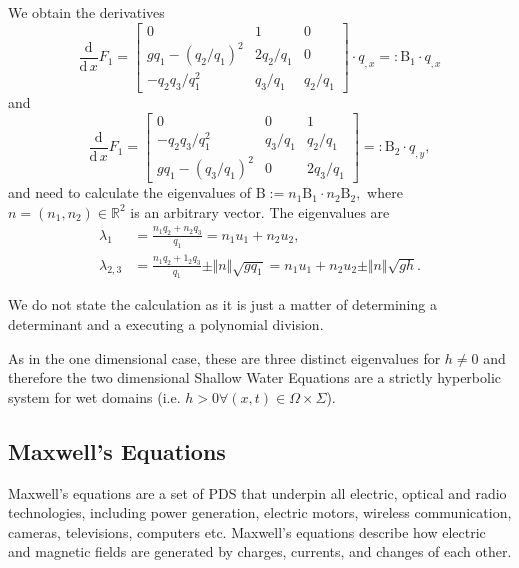 \documentclass[a4paper,12pt]{article}
\theoremstyle{definition}
\theoremstyle{definition}
\def\dx{\mathrm{d}\,x}
\begin{document}
We obtain the derivatives 
\begin{equation}
\frac{\mathrm{d}}{\dx}F_1 = 
\begin{bmatrix}
0 & 1 & 0 \\
gq_1-(q_2/q_1)^2 & 2q_2/q_1 & 0 \\
-q_2q_3/q_1^2 & q_3/q_1 & q_2/q_1
\end{bmatrix} \cdot q_{,x} =: \mathrm{B_1}\cdot q_{,x}
\end{equation}  
and
\begin{equation}
\frac{\mathrm{d}}{\dx}F_1 = 
\begin{bmatrix}
0 & 0 & 1 \\
-q_2q_3/q_1^2 & q_3/q_1 & q_2/q_1\\
gq_1-(q_3/q_1)^2 & 0 & 2q_3/q_1 
\end{bmatrix} =: \mathrm{B_2} \cdot q_{,y},
\end{equation}   
and need to calculate the eigenvalues of
$\mathrm{B}:= n_1\mathrm{B_1} \cdot n_2\mathrm{B_2}, $
where $n = (n_1, n_2) \in \mathbb{R}^2$ is an arbitrary vector.
The eigenvalues are 
\begin{align}
\lambda_1 &= \frac{n_1q_2+n_2q_3}{q_1} = n_1u_1 + n_2u_2, \\
\lambda_{2,3} &= \frac{n_1q_2+1_2q_3}{q_1} \pm \Vert n \Vert \sqrt{gq_1} = n_1u_1 + n_2u_2 \pm \Vert n \Vert\sqrt{gh}.
\end{align}

We do not state the calculation as it is just a matter of determining a determinant and a executing a polynomial division.

As in the one dimensional case, these are three distinct eigenvalues for $h\neq 0$ and therefore the two dimensional Shallow Water Equations are a strictly hyperbolic system for wet domains (i.e. $h>0 \forall (x,t) \in \Omega\times\Sigma$).




\subsection{Maxwell's Equations}


Maxwell's equations are a set of PDS that underpin all electric, optical and radio technologies, including power generation, electric motors, wireless communication, cameras, televisions, computers etc. Maxwell's equations describe how electric and magnetic fields are generated by charges, currents, and changes of each other. 
\end{document}
